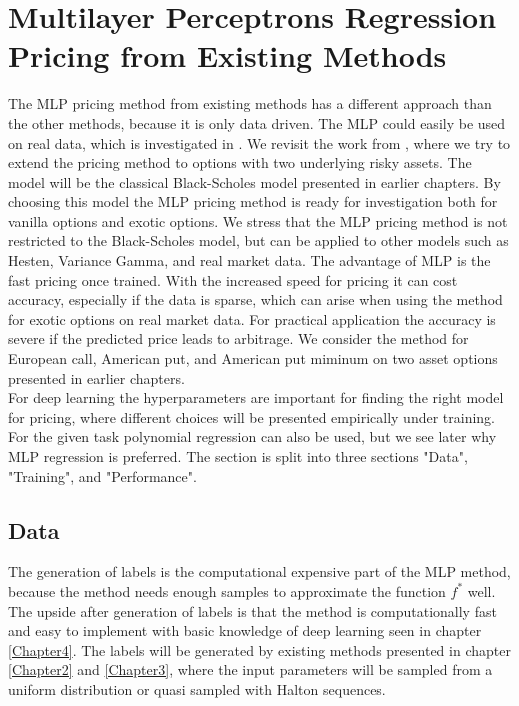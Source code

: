 \section{Multilayer Perceptrons Regression Pricing from Existing Methods}
The MLP pricing method from existing methods has a different approach than the other methods, because it is only data driven. The MLP could easily be used on real data, which is investigated in \parencite{GasparRaquel20}. We revisit the work from \parencite{HirsaAli2019}, where we try to extend the pricing method to options with two underlying risky assets. The model will be the classical Black-Scholes model presented in earlier chapters. By choosing this model the MLP pricing method is ready for investigation both for vanilla options and exotic options. We stress that the MLP pricing method is not restricted to the Black-Scholes model, but can be applied to other models such as Hesten, Variance Gamma, and real market data. The advantage of MLP is the fast pricing once trained. With the increased speed for pricing it can cost accuracy, especially if the data is sparse, which can arise when using the method for exotic options on real market data. For practical application the accuracy is severe if the predicted price leads to arbitrage. We consider the method for European call, American put, and American put miminum on two asset options presented in earlier chapters.\\

For deep learning the hyperparameters are important for finding the right model for pricing, where different choices will be presented empirically under training. For the given task polynomial regression can also be used, but we see later why MLP regression is preferred. The section is split into three sections "Data", "Training", and "Performance".

\subsection{Data}
The generation of labels is the computational expensive part of the MLP method, because the method needs enough samples to approximate the function $f^*$ well. The upside after generation of labels is that the method is computationally fast and easy to implement with basic knowledge of deep learning seen in chapter \ref{Chapter4}. The labels will be generated by existing methods presented in chapter \ref{Chapter2} and \ref{Chapter3}, where the input parameters will be sampled from a uniform distribution or quasi sampled with Halton sequences.\\

